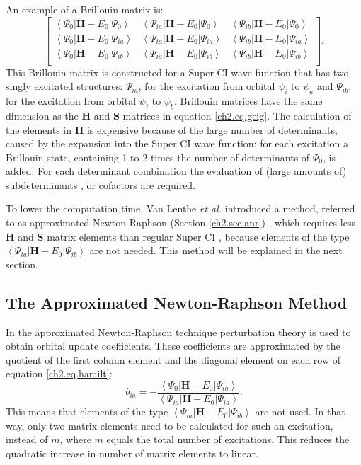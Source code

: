 An example of a Brillouin matrix is:
\begin{equation}
\left[\begin{array}{ccc}
\left< \Psi_{0} | \mathbf{H}-E_0 | \Psi_{0} \right> & \left< \Psi_{ia} | \mathbf{H}-E_0 | \Psi_{0} \right> & \left< \Psi_{ib} | \mathbf{H}-E_0 | \Psi_{0} \right> \\
\left< \Psi_{0} | \mathbf{H}-E_0 | \Psi_{ia} \right> & \left< \Psi_{ia} | \mathbf{H}-E_0 | \Psi_{ia} \right> & \left< \Psi_{ib} | \mathbf{H}-E_0 | \Psi_{ia} \right> \\
\left< \Psi_{0} | \mathbf{H}-E_0 | \Psi_{ib} \right> & \left< \Psi_{ia} | \mathbf{H}-E_0 | \Psi_{ib} \right> & \left< \Psi_{ib} | \mathbf{H}-E_0 | \Psi_{ib} \right> \\
\end{array}\right].
\label{ch2.eq.hamilt}
\end{equation}
This Brillouin matrix is constructed for a Super CI wave function that has two singly excitated structures: $\Psi_{ia}$, for the excitation from orbital $\psi_i$ to $\psi_a$ and $\Psi_{ib}$, for the excitation from orbital $\psi_i$ to $\psi_b$. Brillouin matrices have the same dimension as the $\mathbf{H}$ and $\mathbf{S}$ matrices in equation \ref{ch2.eq.geig}. The calculation of the elements in $\mathbf{H}$ is expensive because of the large number of determinants, caused by the expansion into the Super CI wave function: for each excitation a Brillouin state, containing 1 to 2 times the number of determinants of $\Psi_0$, is added. For each determinant combination the evaluation of (large amounts of) subdeterminants \cite{koos2}, or cofactors are required.

To lower the computation time, Van Lenthe \textit{et al.} introduced a method, referred to as approximated Newton-Raphson (Section \ref{ch2.sec.anr}) \cite{koos1}, which requires less $\mathbf{H}$ and $\mathbf{S}$ matrix elements than regular Super CI \cite{koos1}, because elements of the type $\left < \Psi_{ia} | \mathbf{H} - E_0 | \Psi_{ib} \right >$ are not needed. This method will be explained in the next section.

\subsection{\label{ch2.sec.anr}The Approximated Newton-Raphson Method}

In the approximated Newton-Raphson technique perturbation theory is used to obtain orbital update coefficients. These coefficients are approximated by the quotient of the first column element and the diagonal element on each row of equation \ref{ch2.eq.hamilt}:
\begin{equation}
b_{ia}= - \frac{\left< \Psi_{0} | \mathbf{H}-E_0 | \Psi_{ia} \right>}{\left< \Psi_{ia} | \mathbf{H}-E_0 | \Psi_{ia} \right>}.
\label{ch2.eq.anr}
\end{equation}
This means that elements of the type $\left< \Psi_{ia} | \mathbf{H}-E_0 | \Psi_{ib} \right>$ are not used. In that way, only two matrix elements need to be calculated for such an excitation, instead of $m$, where $m$ equals the total number of excitations. This reduces the quadratic increase in number of matrix elements to linear.

